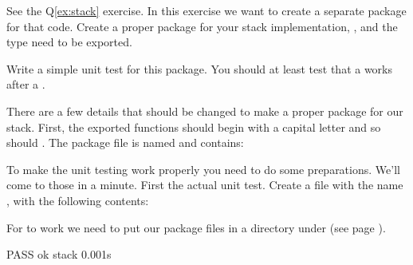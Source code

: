 \begin{Exercise}[title={Stack as package},difficulty=2]
\label{ex:stack-package}
\Question\label{ex:stack-package q1} 
See the Q\ref{ex:stack} exercise. In this exercise we want to create
a separate package for that code.
Create a proper package for your
stack implementation, ,  and the  type need to be
exported.

\Question\label{ex:stack-package q2} Write a simple unit test for this package.
You should at least test that a  works after a .

\end{Exercise}

\begin{Answer}
\Question There are a few details that should be changed to make a proper package
for our stack. First, the exported functions should begin with a capital 
letter and so should . The package file is named 
and contains:


\Question To make the unit testing work properly you need to do some
preparations. We'll come to those in a minute. First the actual unit test.
Create a file with the name , with the following contents:


For  to work we need to put our package files in a directory
under  (see page \pageref{"sec:settings used"}).

\begin{display}
\pr {}
\pr {}
\pr {}
\end{display}

\begin{display}
\pr {}
\pr {}
PASS
ok      stack   0.001s
\end{display}
\end{Answer}
